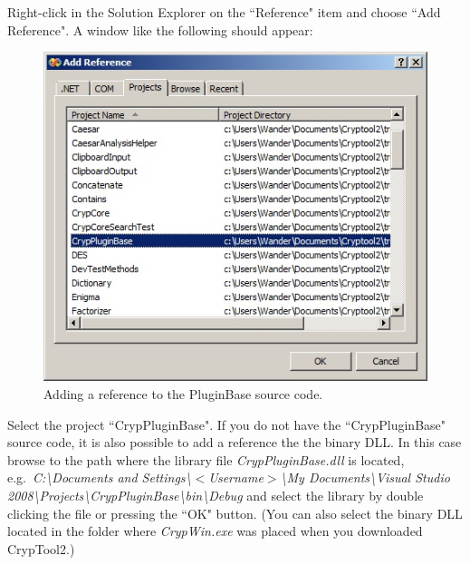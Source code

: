 Right-click in the Solution Explorer on the ``Reference" item and choose ``Add Reference". A window like the following should appear:

\begin{figure}[h!]
	\centering
		\includegraphics{figures/add_pluginbase_source.jpg}
	\caption{Adding a reference to the PluginBase source code.}
	\label{fig:add_pluginbase_source}
\end{figure}
\clearpage

Select the project ``CrypPluginBase". If you do not have the ``CrypPluginBase" source code, it is also possible to add a reference the the binary DLL. In this case browse to the path where the library file \textit{CrypPluginBase.dll} is located, e.g.\ \textit{C:\textbackslash Documents and Settings\textbackslash $<$Username$>$\textbackslash My Documents\textbackslash Visual Studio 2008\textbackslash Projects\textbackslash CrypPluginBase\textbackslash bin\textbackslash Debug} and select the library by double clicking the file or pressing the ``OK" button. (You can also select the binary DLL located in the folder where \textit{CrypWin.exe} was placed when you downloaded CrypTool2.)

